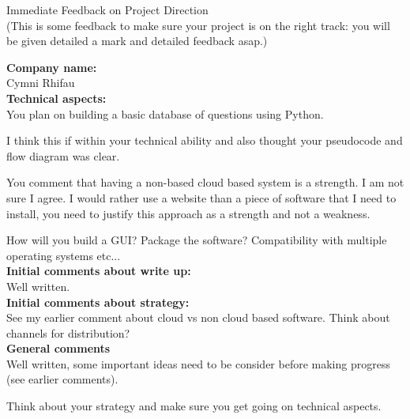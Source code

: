 \documentclass{article}
\begin{document}
\begin{center}
\Huge{Immediate Feedback on Project Direction}\\
\tiny{(This is some feedback to make sure your project is on the right track: you will be given detailed a mark and detailed feedback asap.)}
\end{center}


\normalsize
\textbf{Company name:}\\

Cymni Rhifau \\

\textbf{Technical aspects:}\\

You plan on building a basic database of questions using Python.

I think this if within your technical ability and also thought your pseudocode and flow diagram was clear.

You comment that having a non-based cloud based system is a strength.
I am not sure I agree.
I would rather use a website than a piece of software that I need to install, you need to justify this approach as a strength and not a weakness.

How will you build a GUI? Package the software? Compatibility with multiple operating systems etc...\\

\textbf{Initial comments about write up:}\\

Well written.\\

\textbf{Initial comments about strategy:}\\

See my earlier comment about cloud vs non cloud based software.
Think about channels for distribution?\\

\textbf{General comments}\\

Well written, some important ideas need to be consider before making progress (see earlier comments).

Think about your strategy and make sure you get going on technical aspects.
\end{document}
